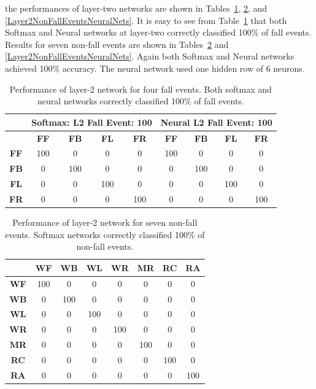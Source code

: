 \documentclass[]{IEEEtran}
\begin{document}
the performances of layer-two networks are shown in Tables~\ref{Layer2FallEvents}, \ref{Layer2NonFallEventsSoftmax}, and \ref{Layer2NonFallEventsNeuralNets}. It is easy to see from Table~\ref{Layer2FallEvents} that both Softmax and Neural networks at layer-two correctly classified 100\% of fall events.
Results for seven non-fall events are shown in Tables~\ref{Layer2NonFallEventsSoftmax} and 
\ref{Layer2NonFallEventsNeuralNets}. Again both Softmax and Neural networks achieved 100\% accuracy. The neural network used one hidden row of 6 neurons.
\begin{table}[htb]
\resizebox{\columnwidth}{!}
{
\begin{tabular}{|c|c|c|c|c||c|c|c|c|}
\hline 
& \multicolumn{4}{c||}{\bf Softmax: L2 Fall Event: 100} & \multicolumn{4}{c|}{\bf Neural 
L2 Fall Event: 100} \\ \hline
& \textbf{FF} & \textbf{FB}  & \textbf{FL} & \textbf{FR} & \textbf{FF} & \textbf{FB}  & 
\textbf{FL} & \textbf{FR} \\ \hline
\textbf{FF} & 100 &  0 &  0 &  0  & 100 &  0 &  0 &  0\\ \hline
\textbf{FB} & 0 &  100 &  0 &  0  & 0 &  100 &  0 &  0\\ \hline
\textbf{FL} & 0 &  0 &  100 &  0  & 0 &  0 &  100 &  0\\ \hline
\textbf{FR} & 0 &  0 &  0 &  100  & 0 &  0 &  0 &  100 \\ \hline
\end{tabular}
}
\caption{ Performance of layer-2 network for  four fall events. Both softmax and neural networks correctly classified 100\% of fall events.}
\label{Layer2FallEvents}
\end{table}



\begin{table}[htb]
\caption{Performance of layer-2 network for  seven non-fall events. Softmax networks correctly classified 100\% of non-fall events.}
\label{Layer2NonFallEventsSoftmax}
\centering
{
\begin{tabular}{|c|c|c|c|c|c|c|c|}
\hline 
 & \textbf{WF} & \textbf{WB} & \textbf{WL} & \textbf{WR} & \textbf{MR} & 
\textbf{RC} & \textbf{RA} \\ \hline    
\textbf{WF} & 100 &  0 &  0 &  0 &  0 &  0 &  0 \\ \hline
\textbf{WB} & 0 &  100 &  0 &  0 &  0 &  0 &  0 \\ \hline
\textbf{WL} & 0 &  0 &  100 &  0 &  0 &  0 &  0 \\ \hline
\textbf{WR} & 0 &  0 &  0 &  100 &  0 &  0 &  0 \\ \hline
\textbf{MR} & 0 &  0 &  0 &  0 &  100 &  0 &  0 \\ \hline
\textbf{RC} & 0 &  0 &  0 &  0 &  0 &  100 &  0 \\ \hline
\textbf{RA} & 0 &  0 &  0 &  0 &  0 &  0 &  100 \\ \hline
\end{tabular}
}
\end{table}
\end{document}
